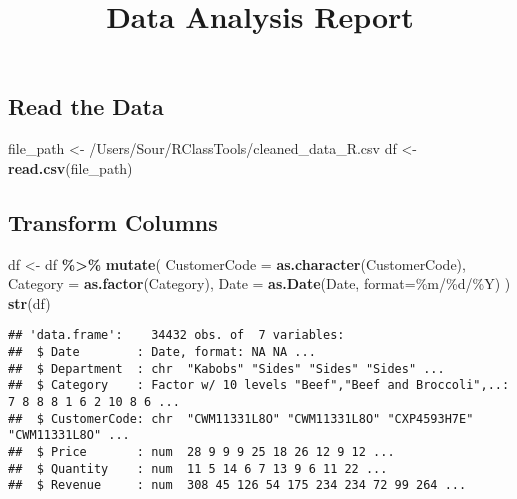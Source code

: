 \documentclass[
]{article}
\title{Data Analysis Report}
\author{}
\date{\vspace{-2.5em}}
\newenvironment{Shaded}{\begin{snugshade}}{\end{snugshade}}
\newcommand{\AttributeTok}[1]{\textcolor[rgb]{0.13,0.29,0.53}{#1}}
\newcommand{\FunctionTok}[1]{\textcolor[rgb]{0.13,0.29,0.53}{\textbf{#1}}}
\newcommand{\NormalTok}[1]{#1}
\newcommand{\OtherTok}[1]{\textcolor[rgb]{0.56,0.35,0.01}{#1}}
\newcommand{\SpecialCharTok}[1]{\textcolor[rgb]{0.81,0.36,0.00}{\textbf{#1}}}
\newcommand{\StringTok}[1]{\textcolor[rgb]{0.31,0.60,0.02}{#1}}
\begin{document}
\maketitle

\subsection{Read the Data}\label{read-the-data}

\begin{Shaded}
\begin{Highlighting}[]
\NormalTok{file\_path }\OtherTok{\textless{}{-}} \StringTok{\textquotesingle{}/Users/Sour/RClassTools/cleaned\_data\_R.csv\textquotesingle{}}
\NormalTok{df }\OtherTok{\textless{}{-}} \FunctionTok{read.csv}\NormalTok{(file\_path)}
\end{Highlighting}
\end{Shaded}

\subsection{Transform Columns}\label{transform-columns}

\begin{Shaded}
\begin{Highlighting}[]
\NormalTok{df }\OtherTok{\textless{}{-}}\NormalTok{ df }\SpecialCharTok{\%\textgreater{}\%}
  \FunctionTok{mutate}\NormalTok{(}
    \AttributeTok{CustomerCode =} \FunctionTok{as.character}\NormalTok{(CustomerCode),}
    \AttributeTok{Category =} \FunctionTok{as.factor}\NormalTok{(Category),}
    \AttributeTok{Date =} \FunctionTok{as.Date}\NormalTok{(Date, }\AttributeTok{format=}\StringTok{\textquotesingle{}\%m/\%d/\%Y\textquotesingle{}}\NormalTok{)}
\NormalTok{  )}
\FunctionTok{str}\NormalTok{(df)}
\end{Highlighting}
\end{Shaded}

\begin{verbatim}
## 'data.frame':    34432 obs. of  7 variables:
##  $ Date        : Date, format: NA NA ...
##  $ Department  : chr  "Kabobs" "Sides" "Sides" "Sides" ...
##  $ Category    : Factor w/ 10 levels "Beef","Beef and Broccoli",..: 7 8 8 8 1 6 2 10 8 6 ...
##  $ CustomerCode: chr  "CWM11331L8O" "CWM11331L8O" "CXP4593H7E" "CWM11331L8O" ...
##  $ Price       : num  28 9 9 9 25 18 26 12 9 12 ...
##  $ Quantity    : num  11 5 14 6 7 13 9 6 11 22 ...
##  $ Revenue     : num  308 45 126 54 175 234 234 72 99 264 ...
\end{verbatim}
\end{document}
